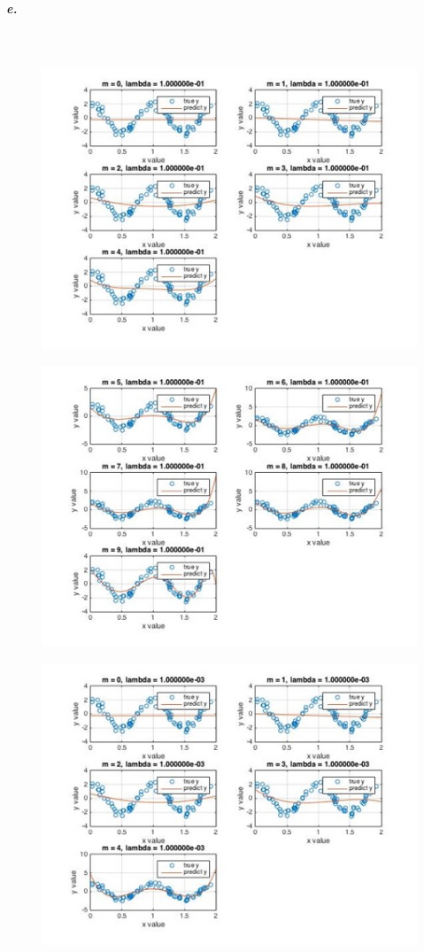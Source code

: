 \documentclass[]{article}
\begin{document}
	\subparagraph{e.}\mbox{}\\
	
	\begin{figure}[H]
		\centering
		\includegraphics[width=0.8\linewidth]{2ge1}
		\caption{}
		\label{fig:2ge1}
	\end{figure}
	\begin{figure}[H]
		\centering
		\includegraphics[width=0.8\linewidth]{2ge2}
		\caption{}
		\label{fig:2ge2}
	\end{figure}
	\begin{figure}[H]
		\centering
		\includegraphics[width=0.8\linewidth]{2ge3}
		\caption{}
		\label{fig:2ge3}
	\end{figure}
\end{document}
